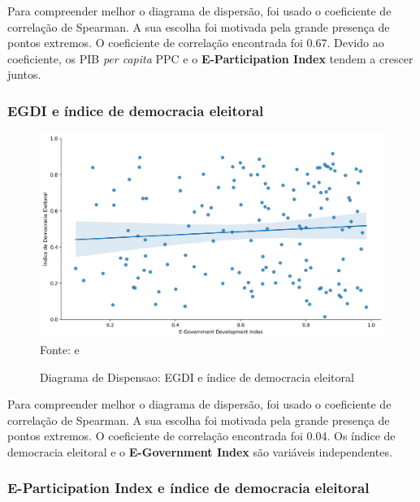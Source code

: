 Para compreender melhor o diagrama de dispersão, foi usado o coeficiente de correlação de Spearman. A sua escolha foi motivada pela grande presença de pontos extremos. O coeficiente de correlação encontrada foi 0.67. Devido ao coeficiente, os PIB \textit{per capita} PPC e o \textbf{E-Participation Index} tendem a crescer juntos.

\subsubsection{EGDI e índice de democracia eleitoral}

\begin{figure}[H]
	\centering
	\caption{Diagrama de Dispensao: EGDI e índice de democracia eleitoral}
	\includegraphics[width=1\linewidth]{figuras/egdi/dispersao_egov_indicedemocracia}
	\label{fig:dispersao_egov_indicedemocracia}
	\footnotesize{Fonte: \cite{ONU_EGDI} e \cite{electoral_democracy_index}}
\end{figure}

Para compreender melhor o diagrama de dispersão, foi usado o coeficiente de correlação de Spearman. A sua escolha foi motivada pela grande presença de pontos extremos. O coeficiente de correlação encontrada foi 0.04. Os índice de democracia eleitoral e o \textbf{E-Government Index} são variáveis independentes.

\subsubsection{E-Participation Index e índice de democracia eleitoral}

